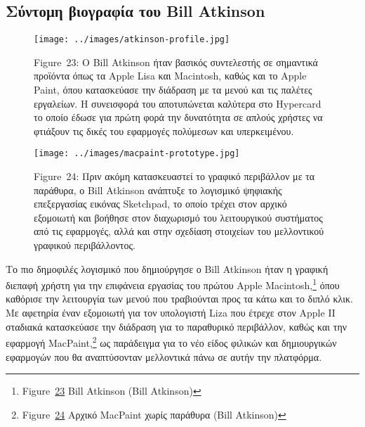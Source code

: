 \documentclass[
]{article}
\begin{document}
\hypertarget{ux3c3ux3cdux3bdux3c4ux3bfux3bcux3b7-ux3b2ux3b9ux3bfux3b3ux3c1ux3b1ux3c6ux3afux3b1-ux3c4ux3bfux3c5-bill-atkinson}{%
\subsection{Σύντομη βιογραφία του Bill
Atkinson}\label{ux3c3ux3cdux3bdux3c4ux3bfux3bcux3b7-ux3b2ux3b9ux3bfux3b3ux3c1ux3b1ux3c6ux3afux3b1-ux3c4ux3bfux3c5-bill-atkinson}}

\leavevmode{}%
\begin{figure}
\hypertarget{fig:atkinson-profile}{%
\centering
\texttt{[image: ../images/atkinson-profile.jpg]}
\caption{Figure~23: Ο Bill Atkinson ήταν βασικός συντελεστής σε
σημαντικά προϊόντα όπως τα Apple Lisa και Macintosh, καθώς και το Apple
Paint, όπου κατασκεύασε την διάδραση με τα μενού και τις παλέτες
εργαλείων. Η συνεισφορά του αποτυπώνεται καλύτερα στο Hypercard το οποίο
έδωσε για πρώτη φορά την δυνατότητα σε απλούς χρήστες να φτιάξουν τις
δικές του εφαρμογές πολύμεσων και
υπερκειμένου.}\label{fig:atkinson-profile}
}
\end{figure}

\leavevmode{}%
\begin{figure}
\hypertarget{fig:macpaint-prototype}{%
\centering
\texttt{[image: ../images/macpaint-prototype.jpg]}
\caption{Figure~24: Πριν ακόμη κατασκευαστεί το γραφικό περιβάλλον με τα
παράθυρα, ο Bill Atkinson ανάπτυξε το λογισμικό ψηφιακής επεξεργασίας
εικόνας Sketchpad, το οποίο τρέχει στον αρχικό εξομοιωτή και βοήθησε
στον διαχωρισμό του λειτουργικού συστήματος από τις εφαρμογές, αλλά και
στην σχεδίαση στοιχείων του μελλοντικού γραφικού
περιβάλλοντος.}\label{fig:macpaint-prototype}
}
\end{figure}

Το πιο δημοφιλές λογισμικό που δημιούργησε ο Bill Atkinson ήταν η
γραφική διεπαφή χρήστη για την επιφάνεια εργασίας του πρώτου Apple
Macintosh,\footnote{Figure~\protect\hyperlink{fig:atkinson-profile}{23}
  Bill Atkinson (Bill Atkinson)} όπου καθόρισε την λειτουργία των μενού
που τραβιούνται προς τα κάτω και το διπλό κλικ. Με αφετηρία έναν
εξομοιωτή για τον υπολογιστή Liza που έτρεχε στον Apple II σταδιακά
κατασκεύασε την διάδραση για το παραθυρικό περιβάλλον, καθώς και την
εφαρμογή MacPaint,\footnote{Figure~\protect\hyperlink{fig:macpaint-prototype}{24}
  Αρχικό MacPaint χωρίς παράθυρα (Bill Atkinson)} ως παράδειγμα για το
νέο είδος φιλικών και δημιουργικών εφαρμογών που θα αναπτύσονταν
μελλοντικά πάνω σε αυτήν την πλατφόρμα.
\end{document}
